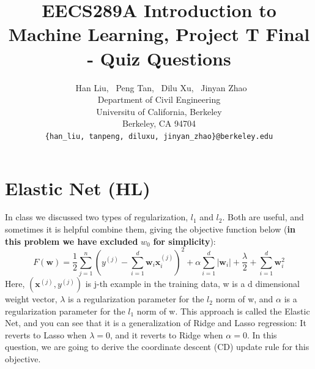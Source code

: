 \documentclass{article}
\renewcommand{\vec}[1]{\boldsymbol{#1}}
\begin{document}
\title{EECS289A Introduction to Machine Learning,  Project T Final - Quiz Questions}
\author{%
  \ Han Liu, \ Peng Tan, \ Dilu Xu, \ Jinyan Zhao \\
  Department of Civil Engineering\\
  Universitu of California, Berkeley\\
  Berkeley, CA 94704 \\
  \texttt{\{han\_liu, tanpeng, diluxu, jinyan\_zhao\}@berkeley.edu} \\
}
\maketitle

\section{Elastic Net (HL)}
In class we discussed two types of regularization, $l_1$ and $l_2$. Both are useful, and sometimes it is helpful combine them, giving the objective function below (\textbf{in this problem we have excluded} $w_0$ \textbf{for simplicity}):
\begin{equation}
F(\vec{w}) = \frac{1}{2}\sum^n_{j=1}(y^{(j)}-\sum^d_{i=1}\vec{w}_i\vec{x}_i^{(j)})^2+\alpha\sum^d_{i=1}|\vec{w}_i|+\frac{\lambda}{2}+\sum^d_{i=1}\vec{w}_i^2
\end{equation}
Here, $(\vec{x}^{(j)},y^{(j)})$ is j-th example in the training data, w is a d dimensional weight vector, $\lambda$ is a regularization parameter for the $l_2$ norm of w, and $\alpha$ is a regularization parameter for the $l_1$ norm of w. This approach is called the Elastic Net, and you can see that it is a generalization of Ridge and Lasso regression: It reverts to Lasso when $\lambda = 0$, and it reverts to Ridge when $\alpha = 0$. In this question, we are going to derive the coordinate descent (CD) update rule for this objective.
\end{document}
